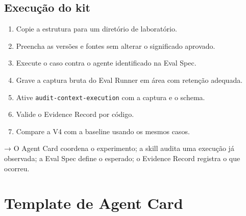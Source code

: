 \documentclass[
  10pt,
  a4paper,
  oneside]{book}
\providecommand{\tightlist}{%
  \setlength{\itemsep}{0pt}\setlength{\parskip}{0pt}}
\begin{document}
\hypertarget{execuuxe7uxe3o-do-kit}{%
\subsection{Execução do kit}\label{execuuxe7uxe3o-do-kit}}

\begin{enumerate}
\def\labelenumi{\arabic{enumi}.}
\tightlist
\item
  Copie a estrutura para um diretório de laboratório.
\item
  Preencha as versões e fontes sem alterar o significado aprovado.
\item
  Execute o caso contra o agente identificado na Eval Spec.
\item
  Grave a captura bruta do Eval Runner em área com retenção adequada.
\item
  Ative \texttt{audit-context-execution} com a captura e o schema.
\item
  Valide o Evidence Record por código.
\item
  Compare a V4 com a baseline usando os mesmos casos.
\end{enumerate}

→ O Agent Card coordena o experimento; a skill audita uma execução já
observada; a Eval Spec define o esperado; o Evidence Record registra o
que ocorreu.

\hypertarget{template-de-agent-card}{%
\section{Template de Agent Card}\label{template-de-agent-card}}
\end{document}
